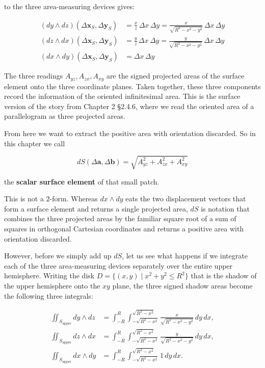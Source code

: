 to the three area-measuring devices gives:

\[\begin{aligned}
(dy \wedge dz)(\Delta\mathbf{x}_S,\Delta\mathbf{y}_S) &= \frac{x}{z}\,\Delta x\,\Delta y
= \frac{x}{\sqrt{R^2-x^2-y^2}}\,\Delta x\,\Delta y \\[4pt]
(dz \wedge dx)(\Delta\mathbf{x}_S,\Delta\mathbf{y}_S) &= \frac{y}{z}\,\Delta x\,\Delta y
= \frac{y}{\sqrt{R^2-x^2-y^2}}\,\Delta x\,\Delta y \\[4pt]
(dx \wedge dy)(\Delta\mathbf{x}_S,\Delta\mathbf{y}_S) &= \Delta x\,\Delta y
\end{aligned}\]

The three readings \(A_{yz},A_{zx},A_{xy}\) are the signed projected
areas of the surface element onto the three coordinate planes. Taken
together, these three components record the information of the oriented
infinitesimal area. This is the surface version of the story from
Chapter 2 §2.4.6, where we read the oriented area of a parallelogram as
three projected areas.

From here we want to extract the positive area with orientation
discarded. So in this chapter we call

\[
dS(\Delta\mathbf{a},\Delta\mathbf{b})
= \sqrt{A_{yz}^2+A_{zx}^2+A_{xy}^2}
\]

the \textbf{scalar surface element} of that small patch.

This is not a \(2\)-form. Whereas \(dx\wedge dy\) eats the two
displacement vectors that form a surface element and returns a single
projected area, \(dS\) is notation that combines the three projected
areas by the familiar square root of a sum of squares in orthogonal
Cartesian coordinates and returns a positive area with orientation
discarded.

However, before we simply add up \(dS\), let us see what happens if we
integrate each of the three area-measuring devices separately over the
entire upper hemisphere. Writing the disk
\(D=\{(x,y)\mid x^2+y^2\le R^2\}\) that is the shadow of the upper
hemisphere onto the \(xy\) plane, the three signed shadow areas become
the following three integrals:

\[\begin{aligned}
\iint_{S_{\text{upper}}} dy\wedge dz
&= \int_{-R}^{R}\int_{-\sqrt{R^2-x^2}}^{\sqrt{R^2-x^2}}
\frac{x}{\sqrt{R^2-x^2-y^2}}\,dy\,dx, \\[4pt]
\iint_{S_{\text{upper}}} dz\wedge dx
&= \int_{-R}^{R}\int_{-\sqrt{R^2-x^2}}^{\sqrt{R^2-x^2}}
\frac{y}{\sqrt{R^2-x^2-y^2}}\,dy\,dx, \\[4pt]
\iint_{S_{\text{upper}}} dx\wedge dy
&= \int_{-R}^{R}\int_{-\sqrt{R^2-x^2}}^{\sqrt{R^2-x^2}}
1\,dy\,dx.
\end{aligned}\]

